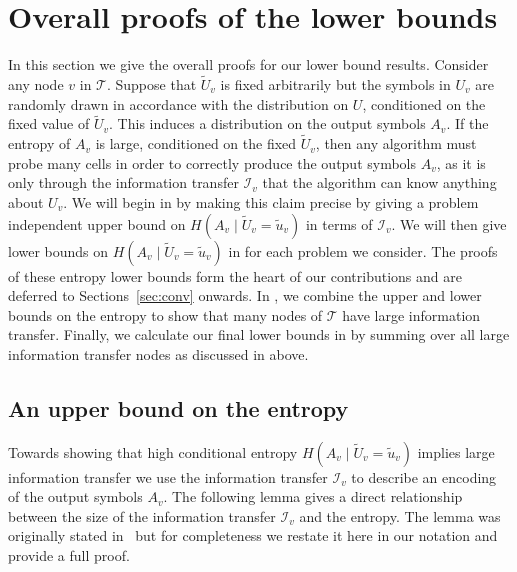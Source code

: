 \documentclass{toc}
\newcommand{\calT}{\ensuremath{\mathcal{T}}}
\newcommand{\lit}{large information transfer\xspace}
\newcommand{\Xv}{\ensuremath{U_v}}
\newcommand{\Xvknown}{\ensuremath{\widetilde{U}_v}}
\newcommand{\Xvfix}{\ensuremath{\widetilde{u}_v}}
\newcommand{\Yv}{\ensuremath{A_v}}
\newcommand{\vitset}{\ensuremath{\mathcal{I}_v}}
\begin{document}
\section{Overall proofs of the lower bounds}\label{sec:proofs}

In this section we give the overall proofs for our lower bound
results.
Consider any node $v$ in $\calT$. Suppose that $\Xvknown$ is fixed arbitrarily but the
symbols in $\Xv$ are randomly drawn in accordance with the distribution
on $U$, conditioned on the fixed value of $\Xvknown$. This induces
a distribution on the output symbols $\Yv$. If the entropy of $\Yv$ is
large, conditioned on the fixed $\Xvknown$, then any algorithm must
probe many cells in order to correctly produce the output symbols $\Yv$, as it is
only through the information transfer $\vitset$ that the algorithm
can know anything about $\Xv$. We will begin in  by making this claim
precise by giving a problem independent upper bound on  $H(\Yv\mid\Xvknown=\Xvfix)$ in terms of  $\vitset$. We will then give lower bounds on $H(\Yv\mid\Xvknown=\Xvfix)$ in   for each problem we consider. The proofs of these entropy lower bounds form the heart of our contributions and are deferred to Sections~\ref{sec:conv} onwards. In , we combine the upper and lower bounds on the entropy to show that many nodes of $\calT$ have \lit. Finally, we calculate our final lower bounds in  by summing over all \lit nodes as discussed in  above.



\subsection{An upper bound on the entropy}\label{sec:entropyupper}

Towards showing that high conditional entropy  $H(\Yv\mid\Xvknown=\Xvfix)$ implies large information transfer we use the information transfer $\vitset$ to describe an encoding of the output symbols $\Yv$. The following lemma gives a direct relationship between the size of the information transfer $\vitset$ and the entropy.
The lemma was originally stated in~\cite{PD2006:Low-Bounds} but for completeness we restate it here in our notation and provide a full proof.
\end{document}
